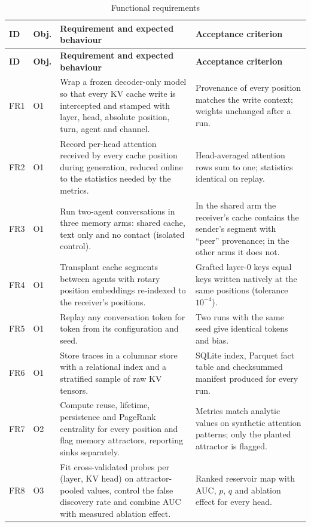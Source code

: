 \begin{longtable}{@{}L{1.0cm}L{1.0cm}L{6.2cm}L{5.8cm}@{}}
\caption{Functional requirements}\label{tab:fr}\\
\toprule
\textbf{ID} & \textbf{Obj.} & \textbf{Requirement and expected behaviour} & \textbf{Acceptance criterion}\\\midrule\endfirsthead
\toprule
\textbf{ID} & \textbf{Obj.} & \textbf{Requirement and expected behaviour} & \textbf{Acceptance criterion}\\\midrule\endhead
FR1 & O1 & Wrap a frozen decoder-only model so that every KV cache write is intercepted and stamped with layer, head, absolute position, turn, agent and channel. & Provenance of every position matches the write context; weights unchanged after a run. \\
FR2 & O1 & Record per-head attention received by every cache position during generation, reduced online to the statistics needed by the metrics. & Head-averaged attention rows sum to one; statistics identical on replay. \\
FR3 & O1 & Run two-agent conversations in three memory arms: shared cache, text only and no contact (isolated control). & In the shared arm the receiver's cache contains the sender's segment with ``peer'' provenance; in the other arms it does not. \\
FR4 & O1 & Transplant cache segments between agents with rotary position embeddings re-indexed to the receiver's positions. & Grafted layer-0 keys equal keys written natively at the same positions (tolerance $10^{-4}$). \\
FR5 & O1 & Replay any conversation token for token from its configuration and seed. & Two runs with the same seed give identical tokens and bias. \\
FR6 & O1 & Store traces in a columnar store with a relational index and a stratified sample of raw KV tensors. & SQLite index, Parquet fact table and checksummed manifest produced for every run. \\
FR7 & O2 & Compute reuse, lifetime, persistence and PageRank centrality for every position and flag memory attractors, reporting sinks separately. & Metrics match analytic values on synthetic attention patterns; only the planted attractor is flagged. \\
FR8 & O3 & Fit cross-validated probes per (layer, KV head) on attractor-pooled values, control the false discovery rate and combine AUC with measured ablation effect. & Ranked reservoir map with AUC, $p$, $q$ and ablation effect for every head. \\

\end{longtable}
